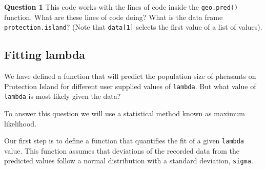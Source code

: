 \documentclass[
]{book}
\newenvironment{Shaded}{\begin{snugshade}}{\end{snugshade}}
\newcommand{\AttributeTok}[1]{\textcolor[rgb]{0.77,0.63,0.00}{#1}}
\newcommand{\ControlFlowTok}[1]{\textcolor[rgb]{0.13,0.29,0.53}{\textbf{#1}}}
\newcommand{\DecValTok}[1]{\textcolor[rgb]{0.00,0.00,0.81}{#1}}
\newcommand{\FunctionTok}[1]{\textcolor[rgb]{0.00,0.00,0.00}{#1}}
\newcommand{\NormalTok}[1]{#1}
\newcommand{\OtherTok}[1]{\textcolor[rgb]{0.56,0.35,0.01}{#1}}
\newcommand{\SpecialCharTok}[1]{\textcolor[rgb]{0.00,0.00,0.00}{#1}}
\begin{document}
\textbf{Question 1} This code works with the lines of code inside the \texttt{geo.pred()} function. What are these lines of code doing? What is the data frame \texttt{protection.island}? (Note that \texttt{data{[}1{]}} selects the first value of a list of values).

\begin{Shaded}
\end{Shaded}

\hypertarget{fitting-lambda}{%
\subsection{Fitting lambda}\label{fitting-lambda}}

We have defined a function that will predict the population size of pheasants on Protection Island for different user supplied values of \texttt{lambda}. But what value of \texttt{lambda} is most likely given the data?

To answer this question we will use a statistical method known as maximum likelihood.

Our first step is to define a function that quantifies the fit of a given \texttt{lambda} value. This function assumes that deviations of the recorded data from the predicted values follow a normal distribution with a standard deviation, \texttt{sigma}.

\begin{Shaded}
\end{Shaded}
\end{document}
